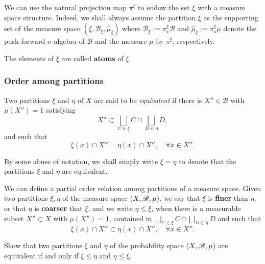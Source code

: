 We can use the natural projection map $\pi^{\xi}$ to endow the set $\xi$ with a measure space structure. Indeed, we shall always assume the partition $\xi$ as the supporting set of the measure space $(\xi,\mathscr{B}_{\xi},\hat\mu_{\xi})$ where $\mathscr{B}_{\xi}:=\pi^{\xi}_{\star}\mathscr{B}$ and $\hat\mu_{\xi}:=\pi^{\xi}_{\star}\mu$ denote the push-forward $\sigma$-algebra of $\mathscr{B}$ and the measure $\mu$ by $\pi^{\xi}$, respectively.

The elements of $\xi$ are called \textbf{atoms} of $\xi$.

\subsubsection{Order among partitions}
\label{sec:order-among-partitons}

Two partitions $\xi$ and $\eta$ of $X$ are said to be \emph{equivalent} if there is $X''\in\mathscr{B}$ with $\mu(X'')=1$ satisfying
\begin{displaymath}
  X''\subset \bigsqcup_{C\in\xi} C \cap \bigsqcup_{D\in\eta} D,
\end{displaymath}
and such that
\begin{equation}
  \label{eq:X''-coincidence-of-partitions}
  \xi(x)\cap X''=\eta(x)\cap X'', \quad\forall x\in X''.
\end{equation}

By some abuse of notation, we shall simply write $\xi=\eta$ to denote that the partitions $\xi$ and $\eta$ are equivalent.

We can define a partial order relation among partitions of a measure space. Given two partitions $\xi,\eta$ of the measure space $(X,\mathscr{B},\mu)$, we say that $\xi$ is \textbf{finer} than $\eta$, or that $\eta$ is \textbf{coarser} that $\xi$, and we write $\eta\leq\xi$, when there is a measurable subset $X''\subset X$ with $\mu(X'')=1$, contained in $\bigsqcup_{C\in\xi} C \cap \bigsqcup_{D\in\eta} D$ and such that
\begin{displaymath}
  \xi(x)\cap X''\subset \eta(x)\cap X'', \quad\forall x\in X''.
\end{displaymath}

\begin{exercise}
  Show that two partitions $\xi$ and $\eta$ of the probability space $(X,\mathscr{B},\mu)$ are equivalent if and only if $\xi\leq\eta$ and $\eta\leq\xi$.
\end{exercise}

